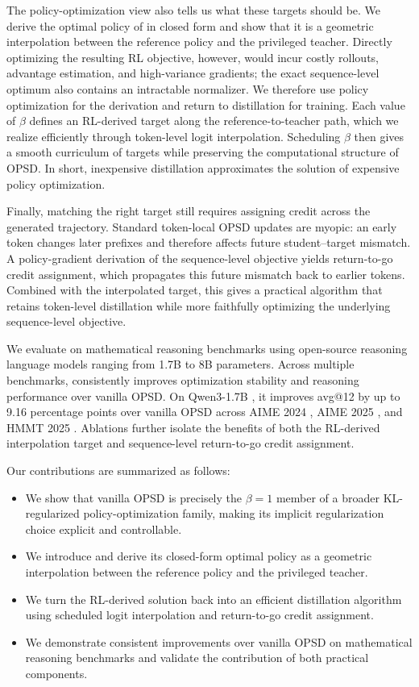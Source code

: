 The policy-optimization view also tells us what these targets should be. We derive the
optimal policy of \ours{} in closed form and show that it is a geometric interpolation
between the reference policy and the privileged teacher. Directly optimizing the resulting
RL objective, however, would incur costly rollouts, advantage estimation, and high-variance
gradients; the exact sequence-level optimum also contains an intractable normalizer. We
therefore use policy optimization for the derivation and return to distillation for training.
Each value of $\beta$ defines an RL-derived target along the reference-to-teacher path, which
we realize efficiently through token-level logit interpolation. Scheduling $\beta$ then gives
a smooth curriculum of targets while preserving the computational structure of OPSD. In
short, inexpensive distillation approximates the solution of expensive policy optimization.

Finally, matching the right target still requires assigning credit across the generated
trajectory. Standard token-local OPSD updates are myopic: an early token changes later
prefixes and therefore affects future student--target mismatch. A policy-gradient derivation
of the sequence-level objective yields return-to-go credit assignment, which propagates this
future mismatch back to earlier tokens. Combined with the interpolated target, this gives a
practical algorithm that retains token-level distillation while more faithfully optimizing the
underlying sequence-level objective.

We evaluate \ours{} on mathematical reasoning benchmarks using open-source reasoning
language models ranging from 1.7B to 8B parameters. Across multiple benchmarks, \ours{}
consistently improves optimization stability and reasoning performance over vanilla OPSD.
On Qwen3-1.7B \citep{yang2025qwen3}, it improves avg@12 by up to 9.16 percentage points
over vanilla OPSD across AIME 2024 \citep{aime24}, AIME 2025 \citep{aime25}, and HMMT
2025 \citep{dekoninck2026matharena}. Ablations further isolate the benefits of both the
RL-derived interpolation target and sequence-level return-to-go credit assignment.


Our contributions are summarized as follows: 
\begin{itemize} 
    \item We show that vanilla OPSD is precisely the $\beta=1$ member of a broader
    KL-regularized policy-optimization family, making its implicit regularization choice
    explicit and controllable.
    \item We introduce \oursbold and derive its closed-form optimal policy as a geometric
    interpolation between the reference policy and the privileged teacher.
    \item We turn the RL-derived solution back into an efficient distillation algorithm using
    scheduled logit interpolation and return-to-go credit assignment.
    \item We demonstrate consistent improvements over vanilla OPSD on mathematical
    reasoning benchmarks and validate the contribution of both practical components.
\end{itemize}


\label{sec:intro}
\vspace{-2mm}
